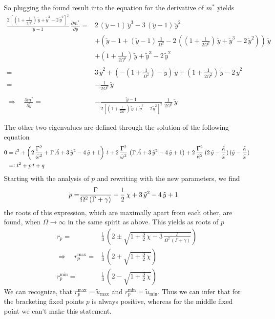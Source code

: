 \documentclass{article}
\begin{document}
So plugging the found result into the equation for the derivative of $m^*$ yields
\begin{align*}
    \frac{2\,\left[(1+\frac{1}{2\Omega^2})\,\tilde{y}+\tilde{y}^3-2\,\tilde{y}^2\right]^2}{\tilde{y}-1}\,\frac{\partial m^*}{\partial\tilde{y}}=&2\,(\tilde{y}-1)\,\tilde{y}^3-3\,(\tilde{y}-1)\,\tilde{y}^2\\
    &+\left( \tilde{y}-1+(\tilde{y}-1)\,\frac{1}{\Omega^2}-2\,\left((1+\frac{1}{2\Omega^2})\,\tilde{y}+\tilde{y}^3-2\,\tilde{y}^2\right) \right)\,\tilde{y}\\
    &+(1+\frac{1}{2\Omega^2})\,\tilde{y}+\tilde{y}^3-2\,\tilde{y}^2 \\\\
    =&3\,\tilde{y}^2+\left( -(1+\frac{1}{\Omega^2})-\tilde{y}\right)\,\tilde{y}+(1+\frac{1}{2\Omega^2})\,\tilde{y}-2\,\tilde{y}^2\\
    =&-\frac{1}{2\Omega^2}\,\tilde{y}\\\\
    \Rightarrow\quad\frac{\partial m^*}{\partial\tilde{y}}=&-\frac{\tilde{y}-1}{2\,\left[(1+\frac{1}{2\Omega^2})\,\tilde{y}+\tilde{y}^3-2\,\tilde{y}^2\right]^2}\,\frac{1}{2\Omega^2}\,\tilde{y}
\end{align*}




The other two eigenvalues are defined through the solution of the following equation
\begin{align*}
    0&=t^2+\left( 2\,\frac{\Gamma^2}{\tilde{\omega}^2}+\Gamma\,\tilde{A}+3\,\tilde{y}^2-4\,\tilde{y}+1  \right)\,t+2\,\frac{\Gamma^2}{\tilde{\omega}^2}\,\left( \Gamma\,\tilde{A}+3\,\tilde{y}^2-4\,\tilde{y}+1 \right)+2\,\frac{\Gamma^2}{\tilde{\kappa}^2}\,(2\,\tilde{y}-\frac{\tilde{\kappa}}{\tilde{\omega}})\,(\tilde{y}-\frac{\tilde{\kappa}}{\tilde{\omega}})\\
    &=\vcentcolon t^2+p\,t+q
\end{align*}
Starting with the analysis of $p$ and rewriting with the new parameters, we find 
\begin{align*}
    p=&\frac{\Gamma}{\Omega^2\,(\Gamma+\gamma)}-\frac{1}{2}\,\chi+3\,\tilde{y}^2-4\,\tilde{y}+1
\end{align*}
the roots of this expression, which are maximally apart from each other, are found, when $\Omega\rightarrow\infty$ in the same spirit as above. This yields as roots of $p$
\begin{align*}
    r_p=&\frac{1}{3}\,\left( 2\pm\sqrt{1+\frac{3}{2}\,\chi-3\,\frac{\Gamma}{\Omega^2\,(\Gamma+\gamma)}} \right)\\
    \Rightarrow\quad r_p^\text{max}=&\frac{1}{3}\,\left( 2+\sqrt{1+\frac{3}{2}\,\chi} \right)\\
    r_p^\text{min}=&\frac{1}{3}\,\left( 2-\sqrt{1+\frac{3}{2}\,\chi} \right)
\end{align*}
We can recognize, that $r_p^\text{max}=\tilde{u}_\text{max}$ and $r_p^\text{min}=\tilde{u}_\text{min}$. Thus we can infer that for the bracketing fixed points $p$ is always positive, whereas for the middle fixed point we can't make this statement.
\end{document}
